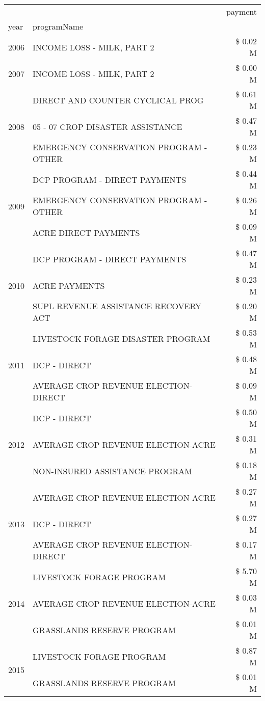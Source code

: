 \begin{tabular}{llr}
\toprule
 &  & payment \\
year & programName &  \\
\midrule
2006 & INCOME LOSS - MILK, PART 2 & \$ 0.02 M \\
\cline{1-3}
2007 & INCOME LOSS - MILK, PART 2 & \$ 0.00 M \\
\cline{1-3}
\multirow[t]{3}{*}{2008} & DIRECT AND COUNTER CYCLICAL PROG & \$ 0.61 M \\
 & 05 - 07 CROP DISASTER ASSISTANCE & \$ 0.47 M \\
 & EMERGENCY CONSERVATION PROGRAM - OTHER & \$ 0.23 M \\
\cline{1-3}
\multirow[t]{3}{*}{2009} & DCP PROGRAM - DIRECT PAYMENTS & \$ 0.44 M \\
 & EMERGENCY CONSERVATION PROGRAM - OTHER & \$ 0.26 M \\
 & ACRE DIRECT PAYMENTS & \$ 0.09 M \\
\cline{1-3}
\multirow[t]{3}{*}{2010} & DCP PROGRAM - DIRECT PAYMENTS & \$ 0.47 M \\
 & ACRE PAYMENTS & \$ 0.23 M \\
 & SUPL REVENUE ASSISTANCE RECOVERY ACT & \$ 0.20 M \\
\cline{1-3}
\multirow[t]{3}{*}{2011} & LIVESTOCK FORAGE DISASTER PROGRAM & \$ 0.53 M \\
 & DCP - DIRECT & \$ 0.48 M \\
 & AVERAGE CROP REVENUE ELECTION-DIRECT & \$ 0.09 M \\
\cline{1-3}
\multirow[t]{3}{*}{2012} & DCP - DIRECT & \$ 0.50 M \\
 & AVERAGE CROP REVENUE ELECTION-ACRE & \$ 0.31 M \\
 & NON-INSURED ASSISTANCE PROGRAM & \$ 0.18 M \\
\cline{1-3}
\multirow[t]{3}{*}{2013} & AVERAGE CROP REVENUE ELECTION-ACRE & \$ 0.27 M \\
 & DCP - DIRECT & \$ 0.27 M \\
 & AVERAGE CROP REVENUE ELECTION-DIRECT & \$ 0.17 M \\
\cline{1-3}
\multirow[t]{3}{*}{2014} & LIVESTOCK FORAGE PROGRAM & \$ 5.70 M \\
 & AVERAGE CROP REVENUE ELECTION-ACRE & \$ 0.03 M \\
 & GRASSLANDS RESERVE PROGRAM & \$ 0.01 M \\
\cline{1-3}
\multirow[t]{3}{*}{2015} & LIVESTOCK FORAGE PROGRAM & \$ 0.87 M \\
 & GRASSLANDS RESERVE PROGRAM & \$ 0.01 M \\

\end{tabular}
